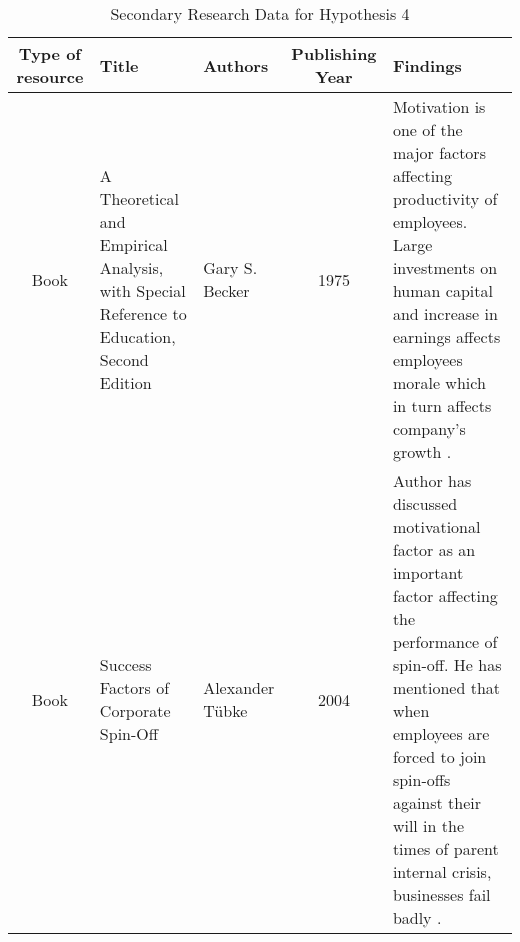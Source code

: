 \begin{table} [h!]
	\centering
	\begin{tabular}{ |c|L{3cm}|L{3cm}|c|L{3cm}| } 
		\hline
		\textbf{Type of resource} & \textbf{Title} & \textbf{Authors} & \textbf{Publishing Year} & \textbf{Findings} \\
		\hline
		Book & A
		Theoretical 
		and
		Empirical
		Analysis,
		with
		Special
		Reference
		to
		Education,
		Second Edition & Gary S. Becker  & 1975 & Motivation is one of the major
		factors affecting productivity
		of
		employees.
		Large
		investments on human capital
		and increase in earnings
		affects employees morale
		which
		in
		turn
		affects
		company’s growth \cite{59}. \\
		\hline
		Book & Success Factors 
		of
		Corporate 
		Spin-Off & Alexander Tübke & 2004 & Author
		has
		discussed
		motivational factor as an
		important factor affecting the
		performance of spin-off. He
		has mentioned that when
		employees are forced to join
		spin-offs against their will in
		the times of parent internal
		crisis, businesses fail badly \cite{57}.\\
		\hline
	\end{tabular}
	\caption{Secondary Research Data for Hypothesis 4}
	\label{table6}
\end{table}
